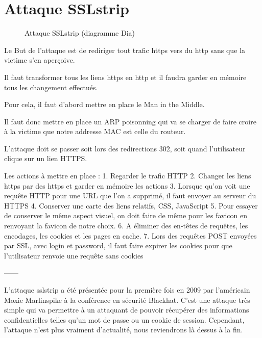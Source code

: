 \chapter{Attaque SSLstrip}

\label{sec:sslstrip}

\begin{figure}[H]
  \caption{Attaque SSLstrip (diagramme Dia)}
\end{figure}

Le But de l'attaque est de rediriger tout trafic https vers du http sans que la victime s'en aperçoive.

Il faut transformer tous les liens https en http et il faudra garder en mémoire tous les changement effectués.

Pour cela, il faut d'abord mettre en place le Man in the Middle.

Il faut donc mettre en place un ARP poisonning qui va se charger de faire croire à la victime que notre addresse MAC est celle du routeur.

L'attaque doit se passer soit lors des redirections 302, soit quand l'utilisateur clique sur un lien HTTPS.

Les actions à mettre en place :
1. Regarder le trafic HTTP
2. Changer les liens https par des https et garder en mémoire les actions
3. Lorsque qu'on voit une requête HTTP pour une URL que l'on a supprimé, il faut envoyer au serveur du HTTPS
4. Conserver une carte des liens relatifs, CSS, JavaScript
5. Pour essayer de conserver le même aspect visuel, on doit faire de même pour les favicon en renvoyant la favicon de notre choix.
6. A éliminer des en-têtes de requêtes, les encodages, les cookies et les pages en cache.
7. Lors des requêtes POST envoyées par SSL, avec login et password, il faut faire expirer les cookies pour que l'utilisateur renvoie une requête sans cookies

------

L'attaque sslstrip a été présentée pour la première fois en 2009 par l'américain Moxie Marlinspike à la conférence en sécurité Blackhat. C'est une attaque très simple qui va permettre à un attaquant de pouvoir récupérer des informations confidentielles telles qu'un mot de passe ou un cookie de session. Cependant, l'attaque n'est plus vraiment d'actualité, nous reviendrons là dessus à la fin.

